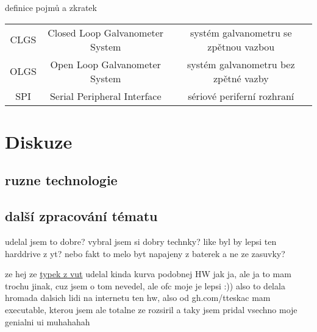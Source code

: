\documentclass{template/socthesis}
\begin{document}
\newpage

definice pojmů a zkratek
\begin{center}
  \begin{tabular}{c c c}
    CLGS & Closed Loop Galvanometer System & systém galvanometru se zpětnou vazbou \\
    OLGS & Open Loop Galvanometer System   & systém galvanometru bez zpětné vazby  \\
    SPI  & Serial Peripheral Interface     & sériové periferní rozhraní            \\
  \end{tabular}
\end{center}





\chapter{Diskuze}
\section{ruzne technologie}

\section{další zpracování tématu}
udelal jsem to dobre? vybral jsem si dobry technky?
like byl by lepsi ten harddrive z yt?
nebo fakt to melo byt napajeny z baterek a ne ze zasuvky?

ze hej ze \href{https://dspace.vutbr.cz/bitstream/handle/11012/38621/final-thesis.pdf?sequence=-1}{typek z vut} udelal kinda kurva podobnej HW jak ja, ale ja to mam trochu jinak, cuz jsem o tom nevedel, ale ofc moje je lepsi :))
also to delala hromada dalsich lidi na internetu ten hw, also od gh.com/tteskac mam executable, kterou jsem ale totalne ze rozsiril a taky jsem pridal vsechno moje genialni ui muhahahah
\end{document}
